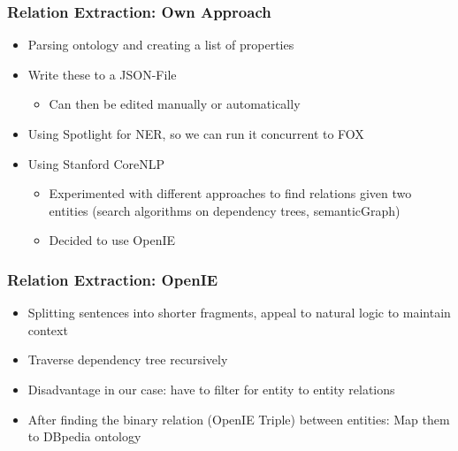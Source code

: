 \documentclass{beamer}
\begin{document}



\begin{frame}
\frametitle{Relation Extraction: Own Approach}
\begin{itemize}
	\item Parsing ontology and creating a list of properties
	\item Write these to a JSON-File 
	\begin{itemize}
		\item Can then be edited manually or automatically
	\end{itemize}
	\item Using Spotlight for NER, so we can run it concurrent to FOX
	\item Using Stanford CoreNLP 
	\begin{itemize}
		\item Experimented with different approaches to find relations given two entities (search algorithms on dependency trees, semanticGraph)
		\item Decided to use OpenIE
	\end{itemize}
\end{itemize}
\end{frame}


\begin{frame}
\frametitle{Relation Extraction: OpenIE }
\begin{itemize}
	\item Splitting sentences into shorter fragments, appeal to natural logic to maintain context
	\item Traverse dependency tree recursively \cite{p1}
	\item Disadvantage in our case: have to filter for entity to entity relations 
	\item After finding the binary relation (OpenIE Triple) between entities: Map them to DBpedia ontology
\end{itemize}
\end{frame}

\end{document}
